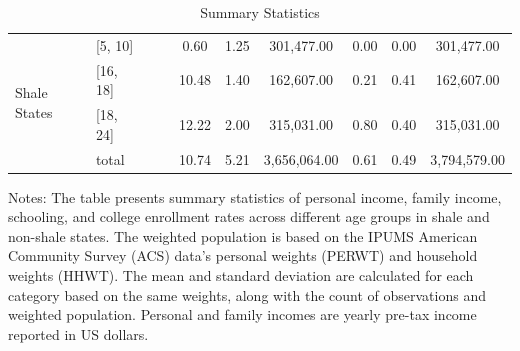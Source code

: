 \begin{table}
\begin{tabular}{l|l||c|c|ccc|ccc}
   \multirow{4}{*}{Shale States}& [5, 10] &  &  & 0.60 & 1.25 & 301,477.00 & 0.00 & 0.00 & 301,477.00 \\ 
   & [16, 18] &  &  & 10.48 & 1.40 & 162,607.00 & 0.21 & 0.41 & 162,607.00 \\ 
   & [18, 24] &  &  & 12.22 & 2.00 & 315,031.00 & 0.80 & 0.40 & 315,031.00 \\ 
   & total &  &  & 10.74 & 5.21 & 3,656,064.00 & 0.61 & 0.49 & 3,794,579.00 \\ 
   \hline
\end{tabular}
\caption{Summary Statistics} 
\begin{minipage}{23cm}
  \scriptsize
  Notes: The table presents summary statistics of personal income, family income, schooling, and college enrollment rates across different age groups in shale and non-shale states. The weighted population is based on the IPUMS American Community Survey (ACS) data's personal weights (PERWT) and household weights (HHWT). 
  The mean and standard deviation are calculated for each category based on the same weights, along with the count of observations and weighted population.
  Personal and family incomes are yearly pre-tax income reported in US dollars.
\end{minipage}
\label{tab:sum_stat}
\end{table}
 